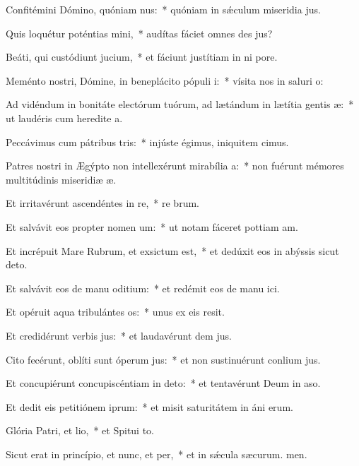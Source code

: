 \item Confitémini Dómino, quóniam nus:~* quóniam in sǽculum miseridia jus.
\item Quis loquétur poténtias mini,~* audítas fáciet omnes des jus?
\item Beáti, qui custódiunt jucium,~* et fáciunt justítiam in ni pore.
\item Meménto nostri, Dómine, in beneplácito pópuli i:~* vísita nos in saluri o:
\item Ad vidéndum in bonitáte electórum tuórum, ad lætándum in lætítia gentis æ:~* ut laudéris cum heredite a.
\item Peccávimus cum pátribus tris:~* injúste égimus, iniquitem cimus.
\item Patres nostri in Ægýpto non intellexérunt mirabília a:~* non fuérunt mémores multitúdinis miseridiæ æ.
\item Et irritavérunt ascendéntes in re,~* re brum.
\item Et salvávit eos propter nomen um:~* ut notam fáceret pottiam am.
\item Et incrépuit Mare Rubrum, et exsictum est,~* et dedúxit eos in abýssis sicut  deto.
\item Et salvávit eos de manu oditium:~* et redémit eos de manu ici.
\item Et opéruit aqua tribulántes os:~* unus ex eis  resit.
\item Et credidérunt verbis jus:~* et laudavérunt dem jus.
\item Cito fecérunt, oblíti sunt óperum jus:~* et non sustinuérunt conlium jus.
\item Et concupiérunt concupiscéntiam in deto:~* et tentavérunt Deum in aso.
\item Et dedit eis petitiónem iprum:~* et misit saturitátem in áni erum.
\item Glória Patri, et lio,~* et Spitui to.
\item Sicut erat in princípio, et nunc, et per,~* et in sǽcula sæcurum. men.
